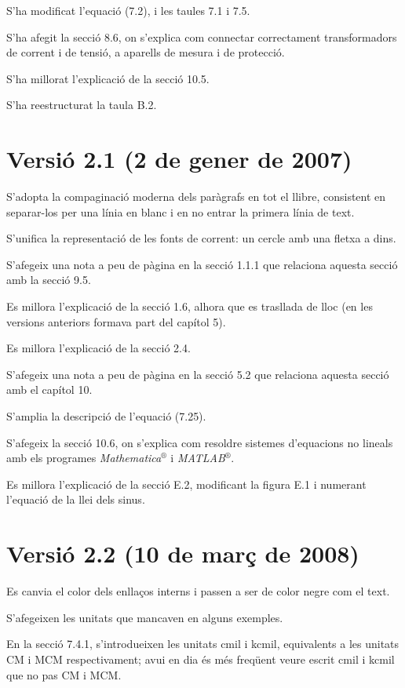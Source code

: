  S'ha modificat l'equació (7.2),
i les taules 7.1 i 7.5.

S'ha afegit la secció 8.6, on s'explica com
connectar correctament transformadors de corrent i de tensió, a
aparells de mesura i de protecció.

S'ha millorat l'explicació de la secció 10.5.

S'ha reestructurat la taula B.2.

\section*{Versió 2.1 (2 de gener de 2007)}

S'adopta la compaginació moderna dels paràgrafs en tot el llibre, consistent en separar-los per una línia en blanc i en no entrar la primera línia de text.

S'unifica la representació de les fonts de corrent: un cercle amb una fletxa a dins.

S'afegeix una nota a peu de pàgina en la secció 1.1.1 que relaciona aquesta secció amb la secció 9.5.

Es millora l'explicació de la secció 1.6, alhora que es trasllada de lloc (en les versions anteriors formava part del capítol 5).

Es millora l'explicació de la secció 2.4.

S'afegeix una nota a peu de pàgina en la secció 5.2 que relaciona aquesta secció amb el capítol 10.

S'amplia la descripció de l'equació (7.25).

S'afegeix la secció 10.6, on s'explica com resoldre sistemes d'equacions no lineals amb els programes \textit{Mathematica}${}^\circledR$ i \textit{MATLAB}${}^\circledR$.

Es millora l'explicació de la secció E.2, modificant la figura E.1 i numerant l'equació de la llei dels sinus.

\section*{Versió 2.2 (10 de març de 2008)}

Es canvia el color dels enllaços interns i passen a ser de color negre com el text.

S'afegeixen les unitats que mancaven en alguns exemples.

En la secció 7.4.1, s'introdueixen les unitats cmil i kcmil, equivalents a les unitats CM i MCM respectivament; avui en dia és més freqüent veure escrit cmil i kcmil que no pas CM i MCM.


